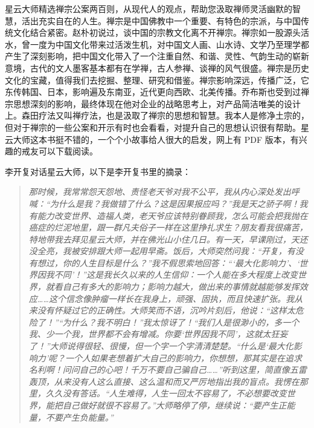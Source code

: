 \begin{book}
    星云大师精选禅宗公案两百则，从现代人的观点，帮助您汲取禅师灵活幽默的智慧，活出充实自在的人生。禅宗是中国佛教中一个重要、有特色的宗派，与中国传统文化结合紧密。赵朴初说过，谈中国的宗教文化离不开禅宗。禅宗如一股源头活水，曾一度为中国文化带来过活泼生机，对中国文人画、山水诗、文学乃至理学都产生了深刻影响，把中国文化带入了一个注重自然、和谐、灵性、气韵生动的崭新意境，古代的文人墨客基本都有在学禅，古人参禅、谈禅的风气很盛。禅宗是历史文化的宝藏，值得我们去挖掘、整理、研究和借鉴。禅宗影响深远，传播广泛，它东传韩国、日本，影响遍及东南亚，近代更向西欧、北美传播。乔布斯也受到过禅宗思想深刻的影响，最终体现在他对企业的战略思考上，对产品简洁唯美的设计上。森田疗法又叫禅疗法，也是汲取了禅宗的思想和智慧。我本人是修净土宗的，但对于禅宗的一些公案和开示有时也会看看，对提升自己的思想认识很有帮助。星云大师这本书挺不错的，一个个小故事给人很大的启发，网上有 PDF 版本，有兴趣的戒友可以下载阅读。

    李开复对话星云大师，以下是李开复书里的摘录：

    \begin{quote}\it
        那时候，我常常怨天怨地、责怪老天爷对我不公平，我从内心深处发出呼喊：“为什么是我？我做错了什么？这是因果报应吗？”我是天之骄子啊！我有能力改变世界、造福人类，老天爷应该特别眷顾我，怎么可能会把我抛在癌症的烂泥地里，跟一群凡夫俗子一样在这里挣扎求生？朋友看我很痛苦，特地带我去拜见星云大师，并在佛光山小住几日。有一天，早课刚过，天还没全亮，我被安排跟大师一起用早斋。饭后，大师突然问我：“开复，有没有想过，你的人生目标是什么？”我不假思索地回答：“‘最大化影响力’、‘世界因我不同’！”这是我长久以来的人生信仰：一个人能在多大程度上改变世界，就看自己有多大的影响力；影响力越大，做出来的事情就越能够发挥效应……这个信念像肿瘤一样长在我身上，顽强、固执，而且快速扩张。我从来没有怀疑过它的正确性。大师笑而不语，沉吟片刻后，他说：“这样太危险了！”“为什么？我不明白！”我太惊讶了！“我们人是很渺小的，多一个我、少一个我，世界都不会有增减。你要‘世界因我不同’，这就太狂妄了！”大师说得很轻、很慢，但一个字一个字清清楚楚。“什么是‘最大化影响力’呢？一个人如果老想着扩大自己的影响力，你想想，那其实是在追求名利啊！问问自己的心吧！千万不要自己骗自己……”听到这里，简直像五雷轰顶，从来没有人这么直接、这么温和而又严厉地指出我的盲点。我愣在那里，久久没有答话。“人生难得，人生一回太不容易了，不必想要改变世界，能把自己做好就很不容易了。”大师略停了停，继续说：“要产生正能量，不要产生负能量。”
    \end{quote}
\end{book}
